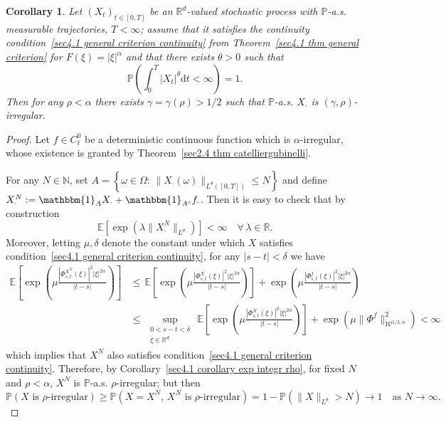 \documentclass[10pt]{article}
\newcommand{\assign}{:=}
\newcommand{\mathd}{\mathrm{d}}
\newtheorem{corollary}[theorem]{Corollary}
\begin{document}
\begin{corollary}
  \label{sec4.1 cor weaker rho irr}Let $(X_t)_{t \in [0, T]}$ be an
  $\mathbb{R}^d$-valued stochastic process with $\mathbb{P}$-a.s. measurable
  trajectories, $T < \infty$; assume that it satisfies the continuity
  condition~\eqref{sec4.1 general criterion continuity} from
  Theorem~\ref{sec4.1 thm general criterion} for $F (\xi) = | \xi |^{\alpha}$
  and that there exists $\theta > 0$ such that
  \[ \mathbb{P} \left( \int_0^T | X_t |^{\theta} \mathd t < \infty \right) =
     1. \]
  Then for any $\rho < \alpha$ there exists $\gamma = \gamma (\rho) > 1 / 2$
  such that $\mathbb{P}$-a.s. $X_{\cdot}$ is $(\gamma,
  \rho)$\mbox{-}irregular.
\end{corollary}

\begin{proof}
  Let $f \in C^0_t$ be a deterministic continuous function which is
  $\alpha$-irregular, whose existence is granted by Theorem~\ref{sec2.4 thm
  catelliergubinelli}.
  
  For any $N \in \mathbb{N}$, set $A = \left\{ \omega \in \Omega : \, \|
  X_{\cdot} (\omega) \|_{L^{\theta} ([0, T])} \leqslant N \right\}$ and define
  $X^N_{\cdot} \assign \mathbbm{1}_A X_{\cdot} + \mathbbm{1}_{A^c} f_{\cdot}$.
  Then it is easy to check that by construction
  \[ \mathbb{E} [\exp (\lambda \| X^N_{\cdot} \|_{L^{\theta}})] < \infty \quad
     \forall \, \lambda \in \mathbb{R}. \]
  Moreover, letting $\mu, \delta$ denote the constant under which $X$
  satisfies condition~\eqref{sec4.1 general criterion continuity}, for any $|
  s - t | < \delta$ we have
%  
  \begin{align*}
    \mathbb{E} \left[ \exp \left( \mu \frac{| \Phi^{X^N}_{s, t} (\xi) |^2 |
    \xi |^{2 \alpha}}{| t - s |} \right) \right] & \leqslant \, \mathbb{E}
    \left[ \exp \left( \mu \frac{| \Phi^X_{s, t} (\xi) |^2 | \xi |^{2
    \alpha}}{| t - s |} \right) \right] + \exp \left( \mu \frac{| \Phi^f_{s,
    t} (\xi) |^2 | \xi |^{2 \alpha}}{| t - s |} \right)\\
    & \leqslant \, {\sup_{\substack{ 0 < s - t < \delta\\
      \xi \in \mathbb{R}^d}}}  \, \mathbb{E} \left[ \exp \left( \mu \frac{| \Phi^X_{s, t}
    (\xi) |^2 | \xi |^{2 \alpha}}{| t - s |} \right) \right] + \exp (\mu \|
    \Phi^f \|_{\mathcal{W}^{1 / 2, \alpha}}^2) < \infty
  \end{align*}
%  
  which implies that $X^N$ also satisfies condition~\eqref{sec4.1 general
  criterion continuity}. Therefore, by Corollary~\ref{sec4.1 corollary exp
  integr rho}, for fixed $N$ and $\rho < \alpha$, $X^N$ is
  $\mathbb{P}$\mbox{-}a.s. $\rho$\mbox{-}irregular; but then
  \[ \mathbb{P} \left( X \text{ is } \rho \text{-irregular} \right) \geqslant
     \mathbb{P} \left( X = X^N, \, X^N \text{ is } \rho \text{-irregular}
     \right) = 1 -\mathbb{P} (\| X \|_{L^{\theta}} > N) \rightarrow 1 \quad
     \text{as } N \rightarrow \infty . \]
\end{proof}
\end{document}
